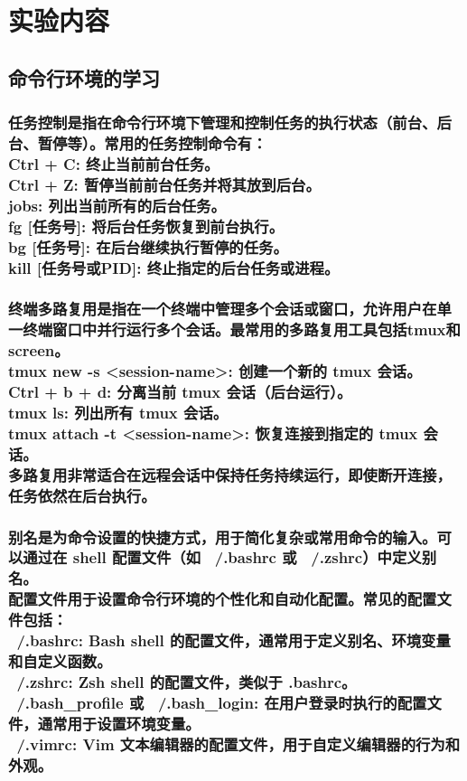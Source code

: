 \documentclass[UTF8,a4paper]{ctexart}
\begin{document}
\begin{sloppypar}
			\bigskip
			\bigskip
			\bigskip
			\bigskip

	\section{实验内容}
	\subsection{命令行环境的学习}
	\subsubsection{任务控制是指在命令行环境下管理和控制任务的执行状态（前台、后台、暂停等）。常用的任务控制命令有：\\Ctrl + C: 终止当前前台任务。\\Ctrl + Z: 暂停当前前台任务并将其放到后台。\\jobs: 列出当前所有的后台任务。\\fg [任务号]: 将后台任务恢复到前台执行。\\bg [任务号]: 在后台继续执行暂停的任务。\\kill [任务号或PID]: 终止指定的后台任务或进程。}
	\subsubsection{终端多路复用是指在一个终端中管理多个会话或窗口，允许用户在单一终端窗口中并行运行多个会话。最常用的多路复用工具包括tmux和screen。\\tmux new -s <session-name>: 创建一个新的 tmux 会话。\\Ctrl + b + d: 分离当前 tmux 会话（后台运行）。\\tmux ls: 列出所有 tmux 会话。\\tmux attach -t <session-name>: 恢复连接到指定的 tmux 会话。\\多路复用非常适合在远程会话中保持任务持续运行，即使断开连接，任务依然在后台执行。}
	\subsubsection{别名是为命令设置的快捷方式，用于简化复杂或常用命令的输入。可以通过在 shell 配置文件（如 ~/.bashrc 或 ~/.zshrc）中定义别名。\\配置文件用于设置命令行环境的个性化和自动化配置。常见的配置文件包括：\\~/.bashrc: Bash shell 的配置文件，通常用于定义别名、环境变量和自定义函数。\\~/.zshrc: Zsh shell 的配置文件，类似于 .bashrc。\\~/.bash\_profile 或 ~/.bash\_login: 在用户登录时执行的配置文件，通常用于设置环境变量。\\~/.vimrc: Vim 文本编辑器的配置文件，用于自定义编辑器的行为和外观。}
	

\end{sloppypar}
\end{document}
